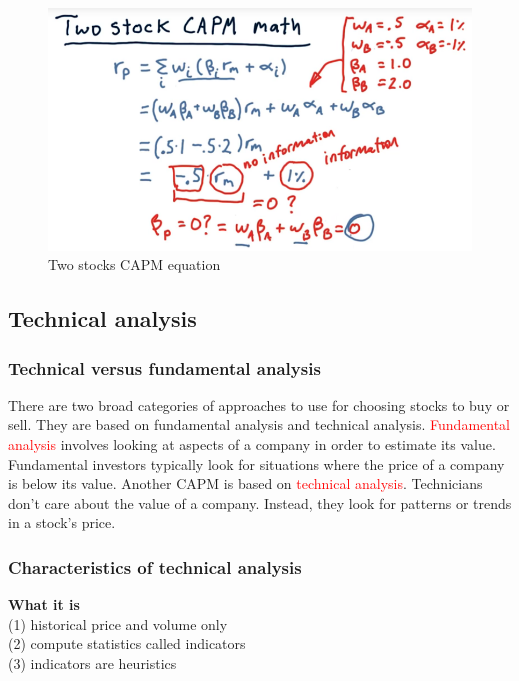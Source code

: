 \documentclass[12pt]{article}
\begin{document}
\begin{figure}[!ht]
\centering
\includegraphics[scale=0.4]{fig/fig44}
\caption{Two stocks CAPM equation}
\end{figure}

\subsection{Technical analysis}

\subsubsection{Technical versus fundamental analysis}

There are two broad categories of approaches to use for choosing stocks to buy or sell. They are based on fundamental analysis and technical analysis. \textcolor{red}{Fundamental analysis} involves looking at aspects of a company in order to estimate its value. Fundamental investors typically look for situations where the price of a company is below its value. Another CAPM is based on \textcolor{red}{technical analysis}. Technicians don't care about the value of a company. Instead, they look for patterns or trends in a stock's price. 

\subsubsection{Characteristics of technical analysis}

\textbf{What it is} \\
(1) historical price and volume only\\
(2) compute statistics called indicators \\
(3) indicators are heuristics 
\end{document}
